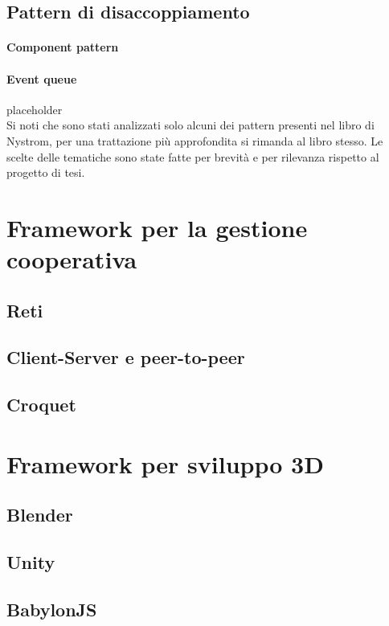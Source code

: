 \subsection{Pattern di disaccoppiamento}\label{ssec:PatternDisaccoppiamento}
\paragraph{Component pattern}
\paragraph{Event queue}
placeholder
\\\newline
Si noti che sono stati analizzati solo alcuni dei pattern presenti nel libro di 
Nystrom, per una trattazione più approfondita si rimanda al libro stesso. Le scelte
delle tematiche sono state fatte per brevità e per rilevanza rispetto al progetto
di tesi.

\section{Framework per la gestione cooperativa}\label{sec:Cooperativa}
\subsection{Reti}\label{ssec:Reti}
\subsection{Client-Server e peer-to-peer}\label{ssec:CS&P2P}
\subsection{Croquet}\label{ssec:IntroCroquet}

\section{Framework per sviluppo 3D}\label{sec:FW3D}
\subsection{Blender}\label{ssec:Blender}
\subsection{Unity}\label{ssec:Unity}
\subsection{BabylonJS}\label{ssec:IntroBabylonJS}